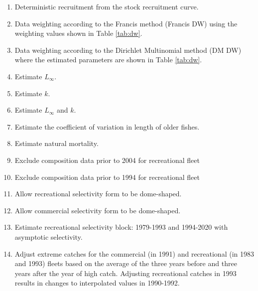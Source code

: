 \documentclass[11pt,
  english,
  a4paper,
]{article}
\begin{document}
\begin{enumerate}
   
  \item Deterministic recruitment from the stock recruitment curve. 

  \item Data weighting according to the Francis method (Francis DW) using the weighting values shown in Table \ref{tab:dw}. 
  
  \item Data weighting according to the Dirichlet Multinomial method (DM DW) where the estimated parameters are shown in Table \ref{tab:dw}. 

  \item Estimate $L_{\infty}$.
  
  \item Estimate $k$.
  
  \item Estimate $L_{\infty}$ and $k$.

  \item Estimate the coefficient of variation in length of older fishes.

  \item Estimate natural mortality.
  
  \item Exclude composition data prior to 2004 for recreational fleet
  
  \item Exclude composition data prior to 1994 for recreational fleet

  \item Allow recreational selectivity form to be dome-shaped. 
  
  \item Allow commercial selectivity form to be dome-shaped.
  
  \item Estimate recreational selectivity block: 1979-1993 and 1994-2020 with asymptotic selectivity.  

  \item Adjust extreme catches for the commercial (in 1991) and recreational (in 1983 and 1993) fleets based on the average of the three years before and three years after the year of high catch. Adjusting recreational catches in 1993 results in changes to interpolated values in 1990-1992.     
  
\end{enumerate}

\end{document}
